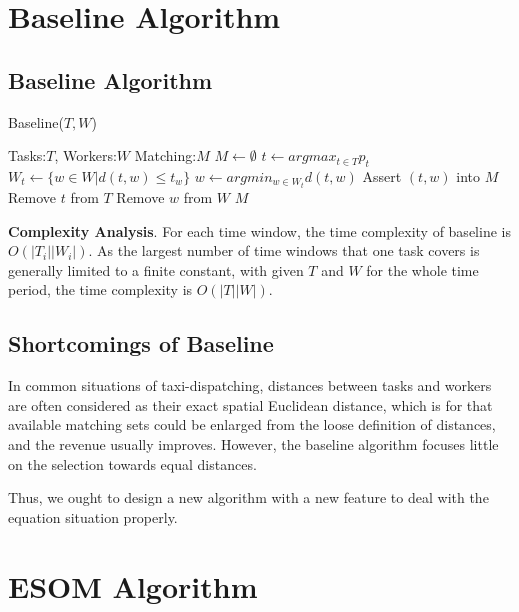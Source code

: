 \documentclass[color,twoside,amssymb,twocolumn]{article}
\begin{document}
\section{Baseline Algorithm}

\setcounter{subsection}{0}

\subsection{Baseline Algorithm}

\begin{algorithm}[h]
	\caption{Baseline($T,W$)}
	\label{alg1}
	\begin{algorithmic}[1]
		\REQUIRE Tasks:$T$, Workers:$W$
		\ENSURE Matching:$M$
		\STATE $M \leftarrow \emptyset$
		\STATE $t \leftarrow argmax_{t\in T}p_t$
		\STATE $W_t \leftarrow \{w\in W|d(t,w)\leq t_w\}$
		\STATE $w \leftarrow argmin_{w\in W_t}d(t,w)$
		\STATE Assert $(t,w)$ into $M$
		\STATE Remove $t$ from $T$
		\STATE Remove $w$ from $W$
		\ENDWHILE
		\RETURN $M$
	\end{algorithmic} 
\end{algorithm}
\noindent \textbf{Complexity Analysis}. For each time window, the time complexity of baseline is $O(|T_i||W_i|)$. As the largest number of time windows that one task covers is generally limited to a finite constant, with given $T$ and $W$ for the whole time period, the time complexity is  $O(|T||W|)$.

\subsection{Shortcomings of Baseline}

In common situations of taxi-dispatching, distances between tasks and workers are often considered as their exact spatial Euclidean distance, which is for that available matching sets could be enlarged from the loose definition of distances, and the revenue usually improves. However, the baseline algorithm focuses little on the selection towards equal distances. 

Thus, we ought to design a new algorithm with a new feature to deal with the equation situation properly.


\section{ESOM Algorithm}

\setcounter{subsection}{0}
\end{document}
